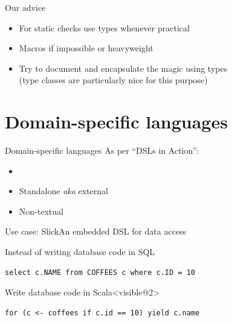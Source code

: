 \documentclass[compress,xcolor={usenames,dvipsnames,table}]{beamer}
\begin{document}

\begin{frame}{Our advice}
  \begin{itemize}
  \item For static checks use types whenever practical
  \item Macros if impossible or heavyweight
  \item Try to document and encapsulate the magic using types\\
        (type classes are particularly nice for this purpose)
  \end{itemize}
\end{frame}

  \section{Domain-specific languages}

\begin{frame}{Domain-specific languages}
  As per ``DSLs in Action'':
  \begin{itemize}
    \item {}
    \item Standalone \emph{aka} external
    \item Non-textual
  \end{itemize}
\end{frame}

\begin{frame}[fragile]{Use case: Slick}{An embedded DSL for data access}
  \vspace{1em}
  \begin{alertblock}{Instead of writing database code in SQL}
    \begin{verbatim}
select c.NAME from COFFEES c where c.ID = 10
    \end{verbatim}
  \end{alertblock}

  \vspace{1em}
  \begin{exampleblock}{Write database code in Scala}<visible@2>
    \begin{verbatim}
for (c <- coffees if c.id == 10) yield c.name
    \end{verbatim}
  \end{exampleblock}
\end{frame}
\end{document}
